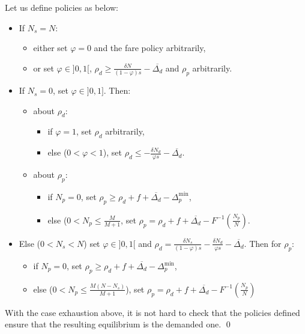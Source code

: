 \documentclass[english, a4paper]{article}
\theoremstyle{plain}
\theoremstyle{definition}
\theoremstyle{remark}
\begin{document}
Let us define policies as below:

\begin{itemize}
    \item If $N_s = N$:
    \begin{itemize}
        \item either set $\varphi = 0$ and the fare policy arbitrarily,
        \item or set $\varphi \in ]0, 1[$, $\rho_d \geq \frac{\delta N}{(1 - \varphi)s} - \overline{\Delta_d}$ and $\rho_p$ arbitrarily.
    \end{itemize}
    \item If $N_s = 0$, set $\varphi \in ]0, 1]$. Then:
    \begin{itemize}
        \item about $\rho_d$:
        \begin{itemize}
            \item if $\varphi = 1$, set $\rho_d$ arbitrarily,
            \item else ($0 < \varphi < 1$), set $\rho_d \leq -\frac{\delta N_d}{\varphi s} - \overline{\Delta_d}$.
        \end{itemize}
        \item about $\rho_p$:
        \begin{itemize}
            \item if $N_p = 0$, set $\rho_p \geq \rho_d + f + \overline{\Delta_d} - \Delta_p^{\text{min}}$,
            \item else ($0< N_p \leq \frac{M}{M + 1}$, set $\rho_p = \rho_d + f + \overline{\Delta_d} - F^{-1}\left( \frac{N_p}{N} \right)$.
        \end{itemize}
    \end{itemize}
    \item Else ($0 < N_s < N$) set $\varphi \in ]0, 1[$ and $\rho_d = \frac{\delta N_s}{(1 - \varphi ) s} - \frac{\delta N_d}{\varphi s} - \overline{\Delta_d}$. Then for $\rho_p$:
    \begin{itemize}
        \item if $N_p = 0$, set $\rho_p \geq \rho_d + f + \overline{\Delta_d} - \Delta_p^{\text{min}}$,
        \item else ($0 < N_p \leq \frac{M(N - N_s)}{M + 1}$), set $\rho_p = \rho_d + f + \overline{\Delta_d} - F^{-1}\left( \frac{N_p}{N} \right)$
    \end{itemize}
\end{itemize}

With the case exhaustion above, it is not hard to check that the policies defined ensure that the resulting equilibrium is the demanded one. \qed
\end{document}
